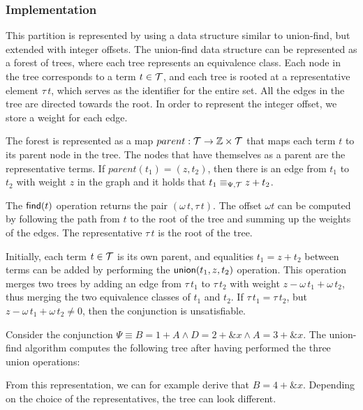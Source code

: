 \subsubsection{Implementation}

This partition is represented by using a data structure similar to union-find, but extended with integer offsets.
The union-find data structure can be represented as a forest of trees,
where each tree represents an equivalence class.
Each node in the tree corresponds to a term $t \in \mathcal{T}$, and each tree is rooted at a representative element $\tau\,t$,
which serves as the identifier for the entire set.\cite{uf-tarjan}
All the edges in the tree are directed towards the root.
In order to represent the integer offset, we store a weight for each edge.

The forest is represented as a map $parent : \mathcal{T} \rightarrow \mathbb{Z} \times \mathcal{T}$ that maps each
term $t$ to its parent node in the tree.
The nodes that have themselves as a parent are the representative terms.
If $parent(t_1) = (z,t_2)$, then there is an edge from $t_1$ to $t_2$ with weight $z$
in the graph and it holds that $t_1 \equiv_{\Psi,\mathcal{T}} z + t_2$.

The $\textsf{find}(t)$ operation returns the pair $(\omega\,t,\tau\,t)$.
The offset $\omega t$ can be computed by following the path from $t$ to the root of the tree and summing up the weights of the edges.
The representative $\tau\,t$ is the root of the tree.

Initially, each term $t\in\mathcal{T}$ is its own parent, and equalities $t_1 = z + t_2$ between terms can be added by performing the
$\textsf{union}(t_1, z, t_2)$ operation.
This operation merges two trees by adding an edge from $\tau\,t_1$ to $\tau\,t_2$ with weight $z - \omega\,t_1 + \omega\,t_2$,
thus merging the two equivalence classes of $t_1$ and $t_2$.
If $\tau\,t_1 = \tau\,t_2$, but $z - \omega\,t_1 + \omega\,t_2 \neq 0$, then the conjunction is
unsatisfiable.

\begin{example}
Consider the conjunction $\Psi \equiv B = 1 + A \land D = 2 + \&x \land A = 3 + \&x$.
The union-find algorithm computes the following tree after having performed the three union operations:


From this representation, we can for example derive that $B = 4 + \&x$.
Depending on the choice of the representatives, the tree can look different.
\end{example}

